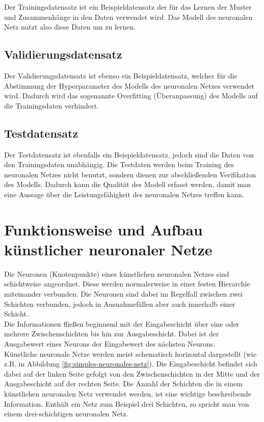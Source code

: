 Der Trainingsdatensatz ist ein Beispieldatensatz der für das Lernen der Muster und Zusammenhänge in den Daten verwendet wird. Das Modell des neuronalen Netz nutzt also diese Daten um zu lernen. \cite{datasolut} \\

\subsection{Validierungsdatensatz}

Der Validierungsdatensatz ist ebenso ein Beispieldatensatz, welcher für die Abstimmung der Hyperparameter des Modells des neuronalen Netzes verwendet wird. Dadurch wird das sogenannte \glqq Overfitting\grqq{} (Überanpassung) des Modells auf die Trainingsdaten verhindert. \cite{datasolut} \\

\subsection{Testdatensatz}

Der Testdatensatz ist ebenfalls ein Beispieldatensatz, jedoch sind die Daten von den Trainingsdaten unabhängig. Die Testdaten werden beim Training des neuronalen Netzes nicht benutzt, sondern dienen zur abschließenden Verifikation des Modells. Dadurch kann die Qualität des Modell erfasst werden, damit man eine Aussage über die Leistungsfähigkeit des neuronalen Netzes treffen kann. \cite{datasolut} \\

\section{Funktionsweise und Aufbau künstlicher neuronaler Netze}

Die Neuronen (Knotenpunkte) eines künstlichen neuronalen Netzes sind schichtweise angeordnet. Diese werden normalerweise in einer festen Hierarchie miteinander verbunden. Die Neuronen sind dabei im Regelfall zwischen zwei Schichten verbunden, jedoch in Ausnahmefällen aber auch innerhalb einer Schicht. \cite{jaai} \\

Die Informationen fließen beginnend mit der Eingabeschicht über eine oder mehrere Zwischenschichten bis hin zur Ausgabeschicht. Dabei ist der Ausgabewert eines Neurons der Eingabewert des nächsten Neurons. \cite{jaai} \\

Künstliche neuronale Netze werden meist schematisch horizontal dargestellt (wie z.B. in Abbildung \ref{fig:simples-neuronales-netz}). Die Eingabeschicht befindet sich dabei auf der linken Seite  gefolgt von den Zwischenschichten in der Mitte und der Ausgabeschicht auf der rechten Seite.
Die Anzahl der Schichten die in einem künstlichen neuronalen Netz verwendet werden, ist eine wichtige beschreibende Information. Enthält ein Netz zum Beispiel drei Schichten, so spricht man von einem drei-schichtigen neuronalen Netz. \cite{jaai}

